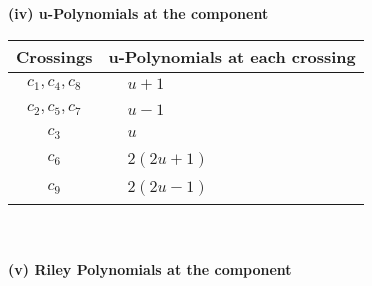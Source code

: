 \documentclass[1p]{elsarticle_modified}
\theoremstyle{definition}
\begin{document}
\newpage\renewcommand{\arraystretch}{1}
\flushleft \textbf{(iv) u-Polynomials at the component}\newline \\
\begin{tabular}{m{50pt}|m{274pt}}
Crossings & \hspace{64pt}u-Polynomials at each crossing \\
\hline $$\begin{aligned}c_{1},c_{4},c_{8}\end{aligned}$$&$\begin{aligned}
&u+1
\end{aligned}$\\
\hline $$\begin{aligned}c_{2},c_{5},c_{7}\end{aligned}$$&$\begin{aligned}
&u-1
\end{aligned}$\\
\hline $$\begin{aligned}c_{3}\end{aligned}$$&$\begin{aligned}
&u
\end{aligned}$\\
\hline $$\begin{aligned}c_{6}\end{aligned}$$&$\begin{aligned}
&2(2 u+1)
\end{aligned}$\\
\hline $$\begin{aligned}c_{9}\end{aligned}$$&$\begin{aligned}
&2(2 u-1)
\end{aligned}$\\
\hline
\end{tabular}\\~\\
\newpage\renewcommand{\arraystretch}{1}
\flushleft \textbf{(v) Riley Polynomials at the component}\newline \\
\end{document}
